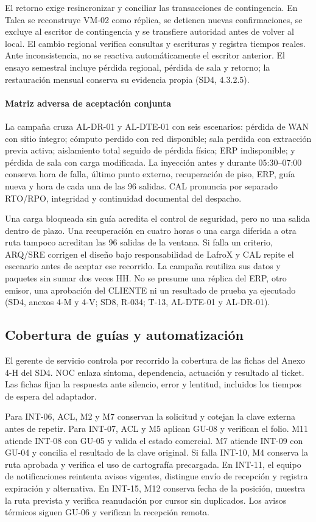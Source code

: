 El retorno exige resincronizar y conciliar las transacciones de contingencia. En Talca se reconstruye VM-02 como réplica, se detienen nuevas confirmaciones, se excluye al escritor de contingencia y se transfiere autoridad antes de volver al local. El cambio regional verifica consultas y escrituras y registra tiempos reales. Ante inconsistencia, no se reactiva automáticamente el escritor anterior. El ensayo semestral incluye pérdida regional, pérdida de sala y retorno; la restauración mensual conserva su evidencia propia (SD4, 4.3.2.5).

\paragraph{Matriz adversa de aceptación conjunta}
La campaña cruza AL-DR-01 y AL-DTE-01 con seis escenarios: pérdida de WAN con sitio íntegro; cómputo perdido con red disponible; sala perdida con extracción previa activa; aislamiento total seguido de pérdida física; ERP indisponible; y pérdida de sala con carga modificada. La inyección antes y durante 05:30--07:00 conserva hora de falla, último punto externo, recuperación de piso, ERP, guía nueva y hora de cada una de las 96 salidas. CAL pronuncia por separado RTO/RPO, integridad y continuidad documental del despacho.

Una carga bloqueada sin guía acredita el control de seguridad, pero no una salida dentro de plazo. Una recuperación en cuatro horas o una carga diferida a otra ruta tampoco acreditan las 96 salidas de la ventana. Si falla un criterio, ARQ/SRE corrigen el diseño bajo responsabilidad de LafroX y CAL repite el escenario antes de aceptar ese recorrido. La campaña reutiliza sus datos y paquetes sin sumar dos veces HH. No se presume una réplica del ERP, otro emisor, una aprobación del CLIENTE ni un resultado de prueba ya ejecutado (SD4, anexos 4-M y 4-V; SD8, R-034; T-13, AL-DTE-01 y AL-DR-01).

\subsection*{Cobertura de guías y automatización}
El gerente de servicio controla por recorrido la cobertura de las fichas del Anexo 4-H del SD4. NOC enlaza síntoma, dependencia, actuación y resultado al ticket. Las fichas fijan la respuesta ante silencio, error y lentitud, incluidos los tiempos de espera del adaptador.

Para INT-06, ACL, M2 y M7 conservan la solicitud y cotejan la clave externa antes de repetir. Para INT-07, ACL y M5 aplican GU-08 y verifican el folio. M11 atiende INT-08 con GU-05 y valida el estado comercial. M7 atiende INT-09 con GU-04 y concilia el resultado de la clave original. Si falla INT-10, M4 conserva la ruta aprobada y verifica el uso de cartografía precargada. En INT-11, el equipo de notificaciones reintenta avisos vigentes, distingue envío de recepción y registra expiración y alternativa. En INT-15, M12 conserva fecha de la posición, muestra la ruta prevista y verifica reanudación por cursor sin duplicados. Los avisos térmicos siguen GU-06 y verifican la recepción remota.


